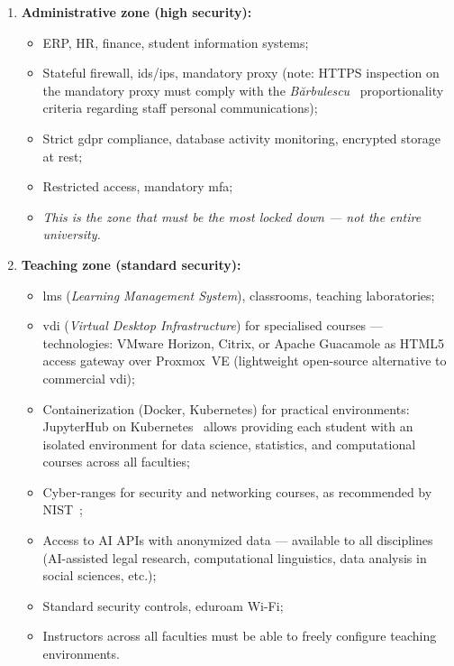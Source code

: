 \begin{enumerate}
    \item \textbf{Administrative zone (high security):}
    \begin{itemize}[nosep]
        \item ERP, HR, finance, student information systems;
        \item Stateful firewall, \gls{ids}/\gls{ips}, mandatory proxy
        (note: HTTPS inspection on the mandatory proxy must comply with
        the \emph{B\u{a}rbulescu}~\cite{barbulescu2017} proportionality criteria regarding
        staff personal communications);
        \item Strict \gls{gdpr} compliance, database activity monitoring,
        encrypted storage at rest;
        \item Restricted access, mandatory \gls{mfa};
        \item \emph{This is the zone that must be the most locked down ---
        not the entire university.}
    \end{itemize}

    \item \textbf{Teaching zone (standard security):}
    \begin{itemize}[nosep]
        \item \gls{lms} (\emph{Learning Management System}), classrooms,
        teaching laboratories;
        \item \gls{vdi} (\emph{Virtual Desktop Infrastructure}) for specialised
        courses --- technologies: VMware Horizon, Citrix, or
        Apache Guacamole as HTML5 access gateway over
        Proxmox~VE (lightweight open-source alternative to
        commercial \gls{vdi});
        \item Containerization (Docker, Kubernetes) for practical
        environments: JupyterHub on Kubernetes~\cite{z2jh} allows providing
        each student with an isolated environment for data science,
        statistics, and computational courses across all faculties;
        \item Cyber-ranges for security and networking courses, as
        recommended by NIST~\cite{nist-cyberrange};
        \item Access to AI APIs with anonymized data --- available to
        all disciplines (AI-assisted legal research, computational
        linguistics, data analysis in social sciences, etc.);
        \item Standard security controls, \gls{eduroam} Wi-Fi;
        \item Instructors across all faculties must be able to freely
        configure teaching environments.
    \end{itemize}


\end{enumerate}
